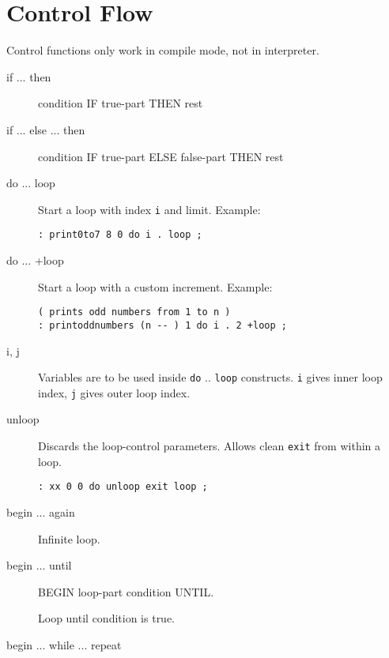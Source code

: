 \section{Control Flow}

Control functions only work in compile mode, not in interpreter.

\begin{description}
\item[if ... then]

condition IF true-part THEN rest

\item[if ... else ... then]

condition IF true-part ELSE false-part THEN rest

\item[do ... loop] Start a loop with index \texttt{i} and limit. Example:

\begin{verbatim}
: print0to7 8 0 do i . loop ;
\end{verbatim}

\item[do ... +loop] Start a loop with a custom increment. Example:

\begin{verbatim}
( prints odd numbers from 1 to n )
: printoddnumbers (n -- ) 1 do i . 2 +loop ;
\end{verbatim}

\item[i, j] Variables are to be used inside \texttt{do} .. \texttt{loop} constructs.
\texttt{i} gives inner loop index, \texttt{j} gives outer loop index.

\item[unloop] Discards the loop-control parameters. Allows clean \texttt{exit} from within a loop.

\begin{verbatim}
: xx 0 0 do unloop exit loop ;
\end{verbatim}

\item[begin ... again]

Infinite loop.

\item[begin ... until]

BEGIN loop-part condition UNTIL.

Loop until condition is true.

\item[begin ... while ... repeat]


\end{description}
